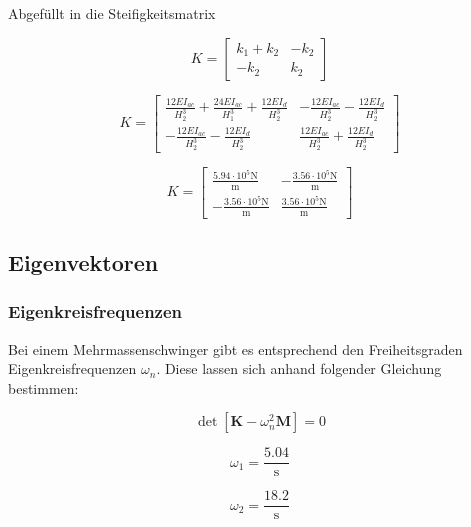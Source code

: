 \documentclass[
  letterpaper,
  DIV=11]{scrreprt}
\begin{document}
Abgefüllt in die Steifigkeitsmatrix

\begin{equation}K = \left[\begin{matrix}k_{1} + k_{2} & - k_{2}\\- k_{2} & k_{2}\end{matrix}\right]\end{equation}

\begin{equation}K = \left[\begin{matrix}\frac{12 EI_{ac}}{H_{2}^{3}} + \frac{24 EI_{ac}}{H_{1}^{3}} + \frac{12 EI_{d}}{H_{2}^{3}} & - \frac{12 EI_{ac}}{H_{2}^{3}} - \frac{12 EI_{d}}{H_{2}^{3}}\\- \frac{12 EI_{ac}}{H_{2}^{3}} - \frac{12 EI_{d}}{H_{2}^{3}} & \frac{12 EI_{ac}}{H_{2}^{3}} + \frac{12 EI_{d}}{H_{2}^{3}}\end{matrix}\right]\end{equation}

\begin{equation}K = \left[\begin{matrix}\frac{5.94 \cdot 10^{5} \text{N}}{\text{m}} & - \frac{3.56 \cdot 10^{5} \text{N}}{\text{m}}\\- \frac{3.56 \cdot 10^{5} \text{N}}{\text{m}} & \frac{3.56 \cdot 10^{5} \text{N}}{\text{m}}\end{matrix}\right]\end{equation}

\hypertarget{eigenvektoren-5}{%
\subsection{Eigenvektoren}\label{eigenvektoren-5}}

\hypertarget{eigenkreisfrequenzen-6}{%
\subsubsection{Eigenkreisfrequenzen}\label{eigenkreisfrequenzen-6}}

Bei einem Mehrmassenschwinger gibt es entsprechend den Freiheitsgraden
Eigenkreisfrequenzen \(\omega_n\). Diese lassen sich anhand folgender
Gleichung bestimmen:

\[\det{[\mathbf{K}-\omega_n^2 \mathbf{M}]=0}\]

\begin{equation}\omega_{1} = \frac{5.04}{\text{s}}\end{equation}

\begin{equation}\omega_{2} = \frac{18.2}{\text{s}}\end{equation}
\end{document}
